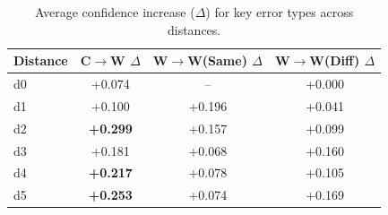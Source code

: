 \begin{table}[h]
\centering
\small
\begin{tabular}{lccc}
\toprule
Distance & C$\to$W $\Delta$ & W$\to$W(Same) $\Delta$ & W$\to$W(Diff) $\Delta$ \\
\midrule
d0 & +0.074 & -- & +0.000 \\
d1 & +0.100 & +0.196 & +0.041 \\
d2 & \textbf{+0.299} & +0.157 & +0.099 \\
d3 & +0.181 & +0.068 & +0.160 \\
d4 & \textbf{+0.217} & +0.078 & +0.105 \\
d5 & \textbf{+0.253} & +0.074 & +0.169 \\
\bottomrule
\end{tabular}
\caption{Average confidence increase ($\Delta$) for key error types across distances.}
\label{tab:simple_conf_delta}
\end{table}